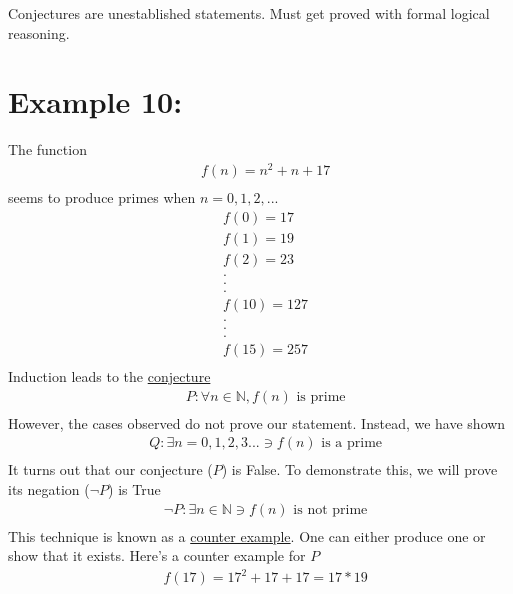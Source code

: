 \documentclass{article}
\begin{document}
Conjectures are unestablished statements. Must get proved with formal logical reasoning.

\section{Example 10:}
The function
\begin{align*}
	& f(n) = n^2 + n + 17 \\
\end{align*}
seems to produce primes when $n = 0,1,2,...$
\begin{align*}
	& f(0) = 17 \\
	& f(1) = 19 \\
	& f(2) = 23 \\
	& . \\
	& . \\
	& . \\
	& f(10) = 127 \\
	& . \\
	& . \\
	& . \\
	& f(15) = 257 \\
\end{align*}
Induction leads to the \underline{conjecture}
\begin{align*}
	& P: \forall n \in \mathbb{N}, f(n) \text{ is prime}\\
\end{align*}
However, the cases observed do not prove our statement. Instead, we have shown
\begin{align*}
	& Q: \exists n = 0,1,2,3... \ni f(n) \text{ is a prime} \\
\end{align*}
It turns out that our conjecture ($P$) is False. To demonstrate this, we will prove its negation ($\neg P$) is True
\begin{align*}
	& \neg P: \exists n \in \mathbb{N} \ni f(n) \text{ is not prime} \\
\end{align*}
This technique is known as a \underline{counter example}. One can either produce one or show that it exists. Here's a counter example for $P$
\begin{align*}
	& f(17) = 17^2 + 17 + 17 = 17 * 19 \\
\end{align*}
\end{document}

